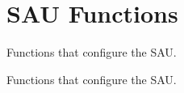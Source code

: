 \hypertarget{group___c_m_s_i_s___core___s_a_u_functions}{}\section{S\+AU Functions}
\label{group___c_m_s_i_s___core___s_a_u_functions}


Functions that configure the S\+AU.  


Functions that configure the S\+AU. 

